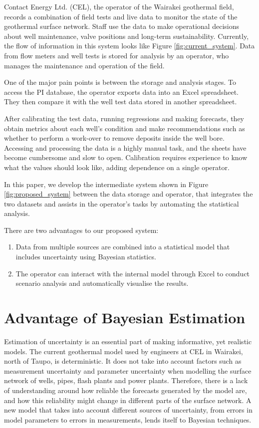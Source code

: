 \documentclass[a4paper, 12pt]{article}
\begin{document}
Contact Energy Ltd. (CEL), the operator of the Wairakei geothermal field, records a combination of field tests and live data to monitor the state of the geothermal surface network. Staff use the data to make operational decisions about well maintenance, valve positions and long-term sustainability. Currently, the flow of information in this system looks like Figure \ref{fig:current_system}. Data from flow meters and well tests is stored for analysis by an operator, who manages the maintenance and operation of the field. 

One of the major pain points is between the storage and analysis stages. To access the PI database, the operator exports data into an Excel spreadsheet. They then compare it with the well test data stored in another spreadsheet.

After calibrating the test data, running regressions and making forecasts, they obtain metrics about each well's condition and make recommendations such as whether to perform a work-over to remove deposits inside the well bore. Accessing and processing the data is a highly manual task, and the sheets have become cumbersome and slow to open. Calibration requires experience to know what the values should look like, adding dependence on a single operator.

In this paper, we develop the intermediate system shown in Figure \ref{fig:proposed_system} between the data storage and operator, that integrates the two datasets and assists in the operator's tasks by automating the statistical analysis.

There are two advantages to our proposed system:
\begin{enumerate}
\item Data from multiple sources are combined into a statistical model that includes uncertainty using Bayesian statistics.
\item The operator can interact with the internal model through Excel to conduct scenario analysis and automatically visualise the results.
\end{enumerate}

\section{Advantage of Bayesian Estimation}
Estimation of uncertainty is an essential part of making informative, yet realistic models. The current geothermal model used by engineers at CEL in Wairakei, north of Taupo, is deterministic. It does not take into account factors such as measurement uncertainty and parameter uncertainty when modelling the surface network of wells, pipes, flash plants and power plants. Therefore, there is a lack of understanding around how reliable the forecasts generated by the model are, and how this reliability might change in different parts of the surface network.
A new model that takes into account different sources of uncertainty, from errors in model parameters to errors in measurements, lends itself to Bayesian techniques. 
\end{document}
